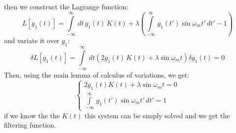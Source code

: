 \documentclass[notitlepage,a4paper,11pt,hyperref=pdftex]{revtex4-1}
\newcommand{\I}[2]{\int\limits_{#1}^{#2}\,}
\begin{document}
then we construct the Lagrange function:
\begin{equation}
 L[g_1(t)] = \I{-\infty}{\infty}dt\,g_1(t)\,K(t) + \lambda(\I{-\infty}{\infty}g_1(t')\sin\omega_mt'\,dt' -1)
\end{equation}
and variate it over $g_1$:
\begin{equation}
 \delta L[g_1(t)] = \I{-\infty}{\infty}dt(2g_1(t)\,K(t) + \lambda\sin\omega_mt)\delta g_1(t) = 0
\end{equation}
Then, using the main lemma of calculus of variations, we get:
\begin{equation}
\begin{cases}
 2 g_1(t)K(t) + \lambda\sin\omega_mt = 0\\
\I{-\infty}{\infty}g_1(t')\sin\omega_mt'\,dt' =1
\end{cases}
\end{equation}
 if we know the the $K(t)$ this system can be simply solved and we get the filtering function.
\end{document}
